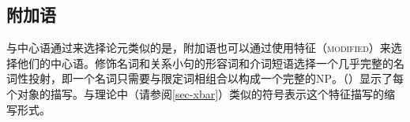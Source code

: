 \subsection{附加语}
\label{Abschnitt-HPSG-Adjunkte}\label{sec-adjuncts-hpsg}

与中心语通过\subcatc 来选择论元类似的是，附加语也可以通过使用特征（\textsc{modified}）来选择他们的中心语。修饰名词和关系小句的形容词和介词短语选择一个几乎完整的名词性投射，即一个名词只需要与限定词相组合以构成一个完整的NP。（）显示了每个对象的描写。与\xbarc 理论中（请参阅\ref{sec-xbar}）类似的符号\nbarc 表示这个特征描写的缩写形式。

